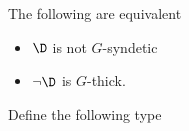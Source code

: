 \begin{fact}\label{fact_fip}
  The following are equivalent
  \begin{itemize}
    \item[1.] $\D$ is not $G$-syndetic
    \item[2.] $\neg\D$ is $G$-thick.
  \end{itemize}\smallskip
\end{fact}







Define the following type



